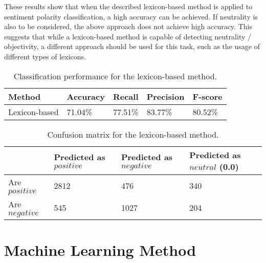 These results show that when the described lexicon-based method is applied to sentiment polarity classification, a high accuracy can be achieved. If neutrality is also to be considered, the above approach does not achieve high accuracy. This suggests that while a lexicon-based method is capable of detecting neutrality / objectivity, a different approach should be used for this task, such as the usage of different types of lexicons.

\begin{table}
\caption{Classification performance for the lexicon-based method.}
\label{tab:eval_lex}
\centering
\begin{tabular}{ |p{3cm}||p{2cm}|p{2cm}|p{2cm}|p{2cm}|}
 \hline
 Method &          Accuracy &      Recall &     Precision& F-score \\
  \hline
 Lexicon-based & 71.04\% & 77.51\% & 83.77\% & 80.52\% \\
 \hline
 \end{tabular}
 
\end{table}
\begin{table}
\centering
\caption{Confusion matrix for the lexicon-based method.}
\begin{tabular}{ |p{3cm}||p{3cm}|p{3cm}|p{3cm}| }
 \hline
  &          Predicted as $positive$ &Predicted as $negative$  & Predicted as $neutral$ (0.0)\\
 \hline
 Are $positive$        & 2812&            476 & 340\\
  \hline
 Are $negative$  &545&                     1027 & 204\\
 \hline

\end{tabular}
\label{tab:evaluations_conf_lex}
\end{table}


\section{Machine Learning Method}


